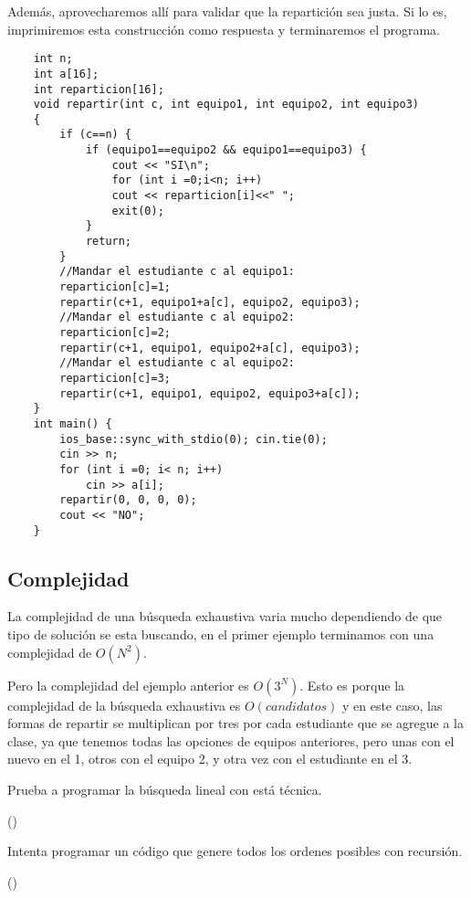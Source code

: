 Además, aprovecharemos allí para validar que la repartición sea justa. Si lo es, imprimiremos esta construcción como respuesta y terminaremos el programa.
\pagebreak
\begin{lstlisting}
	int n;
	int a[16];
	int reparticion[16];
	void repartir(int c, int equipo1, int equipo2, int equipo3) 
	{
		if (c==n) {
			if (equipo1==equipo2 && equipo1==equipo3) {
				cout << "SI\n";
				for (int i =0;i<n; i++) 
				cout << reparticion[i]<<" ";					
				exit(0);
			}
			return;
		}
		//Mandar el estudiante c al equipo1:
		reparticion[c]=1;
		repartir(c+1, equipo1+a[c], equipo2, equipo3);		
		//Mandar el estudiante c al equipo2:
		reparticion[c]=2;
		repartir(c+1, equipo1, equipo2+a[c], equipo3);		
		//Mandar el estudiante c al equipo2:
		reparticion[c]=3;
		repartir(c+1, equipo1, equipo2, equipo3+a[c]);
	}
	int main() {
		ios_base::sync_with_stdio(0); cin.tie(0);
		cin >> n;
		for (int i =0; i< n; i++) 
			cin >> a[i];		
		repartir(0, 0, 0, 0);
		cout << "NO";
	}	
\end{lstlisting}

\subsection{Complejidad}

La complejidad de una búsqueda exhaustiva varia mucho dependiendo de que tipo de solución se esta buscando, en el primer ejemplo terminamos con una complejidad de \(O(N^2)\). 

Pero la complejidad del ejemplo anterior es \(O(3^N)\). Esto es porque la complejidad de la búsqueda exhaustiva es \(O(candidatos)\) y en este caso, las formas de repartir se multiplican por tres por cada estudiante que se agregue a la clase, ya que tenemos todas las opciones de equipos anteriores, pero unas con el nuevo en el 1, otros con el equipo 2, y otra vez con el estudiante en el 3.


\begin{exercise}
	Prueba a programar la búsqueda lineal con está técnica.
	
	()
\end{exercise}


\begin{exercise}
	Intenta programar un código que genere todos los ordenes posibles con recursión.
	
	()
\end{exercise}